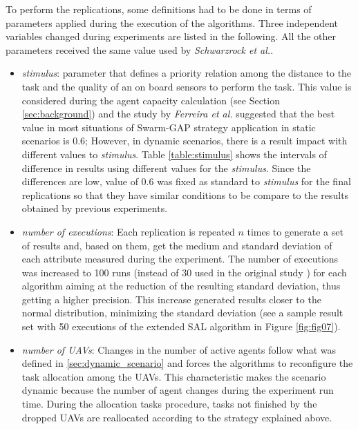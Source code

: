 To perform the replications, some definitions had to be done in terms of parameters applied during the execution of the algorithms. Three independent variables changed during experiments are listed in the following. All the other parameters received the same value used by \textit{Schwarzrock et al.}\cite{MAS07}.
\begin{itemize}
   \item \textit{stimulus}: parameter that defines a priority relation among the distance to the task and the quality of an on board sensors to perform the task. This value is considered during the agent capacity calculation (see Section \ref{sec:background}) and the study by \textit{Ferreira et al.} \cite{ferreira2010robocup} suggested that the best value in most situations of Swarm-GAP strategy application in static scenarios is $0.6$; However, in dynamic scenarios, there is a result impact with different values to \textit{stimulus}. Table \ref{table:stimulus} shows the intervals of difference in results using different values for the \textit{stimulus}. Since the differences are low, value of $0.6$ was fixed as standard to \textit{stimulus} for the final replications so that they have similar conditions to be compare to the results obtained by previous experiments.
   \item \textit{number of executions}: Each replication is repeated $n$ times to generate a set of results and, based on them, get the medium and standard deviation of each attribute measured during the experiment. The number of executions was increased to 100 runs (instead of 30 used in the original study \cite{MAS07}) for each algorithm aiming at the reduction of the resulting standard deviation, thus getting a higher precision. This increase generated results closer to the normal distribution, minimizing the standard deviation (see a sample result set with 50 executions of the extended SAL algorithm in Figure \ref{fig:fig07}).
   \item \textit{number of UAVs}: Changes in the number of active agents follow what was defined in \ref{sec:dynamic_scenario} and forces the algorithms to reconfigure the task allocation among the UAVs. This characteristic makes the scenario dynamic because the number of agent changes during the experiment run time. During the allocation tasks procedure, tasks not finished by the dropped UAVs are reallocated according to the strategy explained above.
\end{itemize}


